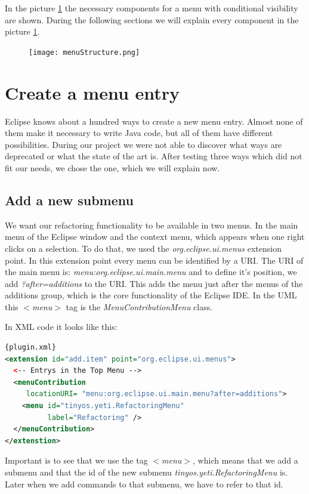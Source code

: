 \documentclass[a4paper,10pt]{report}
\begin{document}
In the picture \ref{menuStructure} the necessary components for a menu with conditional visibility are shown.
During the following sections we will explain every component in the picture \ref{menuStructure}.
\begin{figure}[h]
\centering
\texttt{[image: menuStructure.png]}
\label{menuStructure} 
\end{figure}

\section{Create a menu entry}
Eclipse knows about a hundred ways to create a new menu entry.
Almost none of them make it necessary to write Java code, but all of them have different possibilities. 
During our project we were not able to discover what ways are deprecated or what the state of the art is.
After testing three ways which did not fit our needs, we chose the one, which we will explain now. 

\subsection{Add a new submenu}
We want our refactoring functionality to be available in two menus. 
In the main menu of the Eclipse window and the context menu, which appears when one right clicks on a selection.
To do that, we used the {\it org.eclipse.ui.menus} extension point.
In this extension point every menu can be identified by a URI. The URI of the main menu is:
{\it menu:org.eclipse.ui.main.menu} and to define it's position, we add {\it ?after=additions} to the URI.
This adds the menu just after the menus of the additions group, which is the core functionality of the Eclipse IDE.
In the UML this {\it $<$menu$>$} tag is the {\it MenuContributionMenu} class.

In XML code it looks like this:
\begin{lstlisting}[language=XML,caption=Create menu folder ({\it plugin.xml})]{plugin.xml}
<extension id="add.item" point="org.eclipse.ui.menus">
  <-- Entrys in the Top Menu -->
  <menuContribution
     locationURI= "menu:org.eclipse.ui.main.menu?after=additions">
    <menu id="tinyos.yeti.RefactoringMenu"
          label="Refactoring" />
  </menuContribution>
</extenstion>
\end{lstlisting}
Important is to see that we use the tag {\it $<$menu$>$}, which means that we add a submenu and that the id of the new submenu {\it tinyos.yeti.RefactoringMenu} is. 
Later when we add commands to that submenu, we have to refer to that id.
\end{document}
